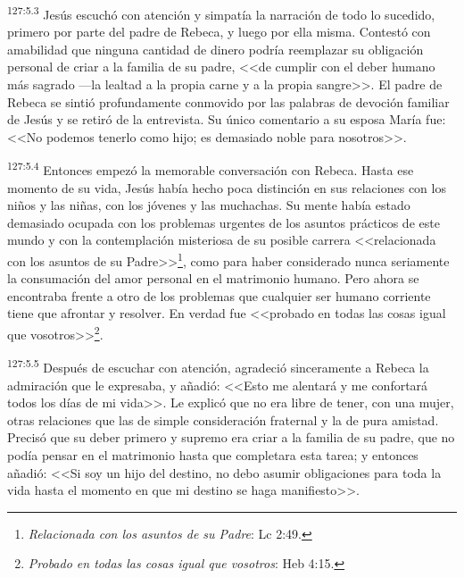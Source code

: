 \par 
\textsuperscript{127:5.3} Jesús escuchó con atención y simpatía la narración de todo lo sucedido, primero por parte del padre de Rebeca, y luego por ella misma. Contestó con amabilidad que ninguna cantidad de dinero podría reemplazar su obligación personal de criar a la familia de su padre, <<de cumplir con el deber humano más sagrado ---la lealtad a la propia carne y a la propia sangre>>. El padre de Rebeca se sintió profundamente conmovido por las palabras de devoción familiar de Jesús y se retiró de la entrevista. Su único comentario a su esposa María fue: <<No podemos tenerlo como hijo; es demasiado noble para nosotros>>.

\par 
\textsuperscript{127:5.4} Entonces empezó la memorable conversación con Rebeca. Hasta ese momento de su vida, Jesús había hecho poca distinción en sus relaciones con los niños y las niñas, con los jóvenes y las muchachas. Su mente había estado demasiado ocupada con los problemas urgentes de los asuntos prácticos de este mundo y con la contemplación misteriosa de su posible carrera <<relacionada con los asuntos de su Padre>>\footnote{\textit{Relacionada con los asuntos de su Padre}: Lc 2:49.}, como para haber considerado nunca seriamente la consumación del amor personal en el matrimonio humano. Pero ahora se encontraba frente a otro de los problemas que cualquier ser humano corriente tiene que afrontar y resolver. En verdad fue <<probado en todas las cosas igual que vosotros>>\footnote{\textit{Probado en todas las cosas igual que vosotros}: Heb 4:15.}.

\par 
\textsuperscript{127:5.5} Después de escuchar con atención, agradeció sinceramente a Rebeca la admiración que le expresaba, y añadió: <<Esto me alentará y me confortará todos los días de mi vida>>. Le explicó que no era libre de tener, con una mujer, otras relaciones que las de simple consideración fraternal y la de pura amistad. Precisó que su deber primero y supremo era criar a la familia de su padre, que no podía pensar en el matrimonio hasta que completara esta tarea; y entonces añadió: <<Si soy un hijo del destino, no debo asumir obligaciones para toda la vida hasta el momento en que mi destino se haga manifiesto>>.

